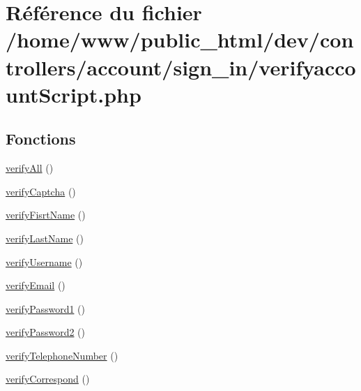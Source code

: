 \hypertarget{verifyaccount_script_8php}{\section{Référence du fichier /home/www/public\-\_\-html/dev/controllers/account/sign\-\_\-in/verifyaccount\-Script.php}
\label{verifyaccount_script_8php}
}
\subsection*{Fonctions}
\begin{DoxyCompactItemize}
\item 
\hyperlink{verifyaccount_script_8php_a9626885a5e57d7ad6153bcaa4eaeee32}{verify\-All} ()
\item 
\hyperlink{verifyaccount_script_8php_acaeb66498f74ac8542ebe37ccab0c1d0}{verify\-Captcha} ()
\item 
\hyperlink{verifyaccount_script_8php_a010b0621c09e950c7811644cd153562a}{verify\-Fisrt\-Name} ()
\item 
\hyperlink{verifyaccount_script_8php_a4fec8f98e462729d5a6b00f83ad5da8f}{verify\-Last\-Name} ()
\item 
\hyperlink{verifyaccount_script_8php_a16f15862e45d89831f1033914d72b1cf}{verify\-Username} ()
\item 
\hyperlink{verifyaccount_script_8php_a0f19adfee180a377bbff01822dcfd77a}{verify\-Email} ()
\item 
\hyperlink{verifyaccount_script_8php_aabfc862ec3cc476eed99b62db613d893}{verify\-Password1} ()
\item 
\hyperlink{verifyaccount_script_8php_a0be66fc9f1e7db29f780081cd6c80caa}{verify\-Password2} ()
\item 
\hyperlink{verifyaccount_script_8php_a4cf333d5992ef9949517d9844282178f}{verify\-Telephone\-Number} ()
\item 
\hyperlink{verifyaccount_script_8php_a2babddb026b8a4d87d8b8a49ffb23076}{verify\-Correspond} ()
\end{DoxyCompactItemize}

